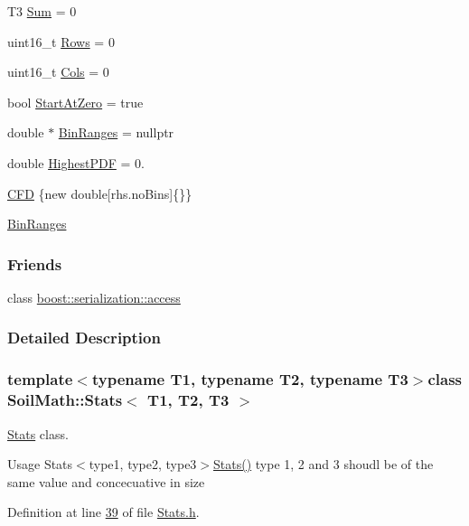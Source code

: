 \begin{DoxyCompactItemize}
T3 \hyperlink{class_soil_math_1_1_stats_af326fa61048522fc146b799759e345f9}{Sum} = 0
\item 
uint16\+\_\+t \hyperlink{class_soil_math_1_1_stats_a0e462c013f12f02e31e9ae03334151c3}{Rows} = 0
\item 
uint16\+\_\+t \hyperlink{class_soil_math_1_1_stats_a971f1ec23c32137805c4577f05454d83}{Cols} = 0
\item 
bool \hyperlink{class_soil_math_1_1_stats_a06f5e8404c2a0fa303dbb18a58d6deb5}{Start\+At\+Zero} = true
\item 
double $\ast$ \hyperlink{class_soil_math_1_1_stats_a0d452c96b6f499f054432bd3b52d1302}{Bin\+Ranges} = nullptr
\item 
double \hyperlink{class_soil_math_1_1_stats_a85da0692f7d25c9d5add1f8ffd67bdf2}{Highest\+P\+D\+F} = 0.
\item 
\hyperlink{class_soil_math_1_1_stats_a4c462b7b476263abc57d3f1faba1b2da}{C\+F\+D} \{new double\mbox{[}rhs.\+no\+Bins\mbox{]}\{\}\}
\item 
\hyperlink{class_soil_math_1_1_stats_a926290338b0325a457f65d562a328e07}{Bin\+Ranges}
\end{DoxyCompactItemize}
\subsubsection*{Friends}
\begin{DoxyCompactItemize}
\item 
class \hyperlink{class_soil_math_1_1_stats_ac98d07dd8f7b70e16ccb9a01abf56b9c}{boost\+::serialization\+::access}
\end{DoxyCompactItemize}


\subsubsection{Detailed Description}
\subsubsection*{template$<$typename T1, typename T2, typename T3$>$class Soil\+Math\+::\+Stats$<$ T1, T2, T3 $>$}

\hyperlink{class_soil_math_1_1_stats}{Stats} class. 

Usage Stats$<$type1, type2, type3$>$\hyperlink{class_soil_math_1_1_stats_aa9727b7ea39b46f8a010a7b710b26d83}{Stats()} type 1, 2 and 3 shoudl be of the same value and concecuative in size 

Definition at line \hyperlink{_stats_8h_source_l00039}{39} of file \hyperlink{_stats_8h_source}{Stats.\+h}.



